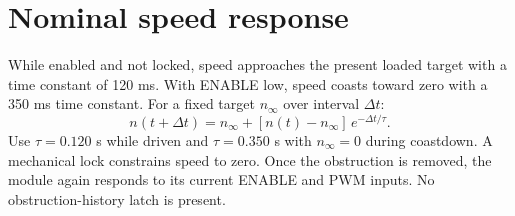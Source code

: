 \documentclass[10pt]{article}
\begin{document}
\section*{Nominal speed response}
While enabled and not locked, speed approaches the present loaded target with a time constant of 120 ms. With ENABLE low, speed coasts toward zero with a 350 ms time constant. For a fixed target $n_{\infty}$ over interval $\Delta t$:
\[
 n(t+\Delta t)=n_{\infty}+[n(t)-n_{\infty}]\,e^{-\Delta t/\tau}.
\]
Use $\tau=0.120$ s while driven and $\tau=0.350$ s with $n_{\infty}=0$ during coastdown. A mechanical lock constrains speed to zero. Once the obstruction is removed, the module again responds to its current ENABLE and PWM inputs. No obstruction-history latch is present.
\begin{center}
\end{center}
\end{document}
